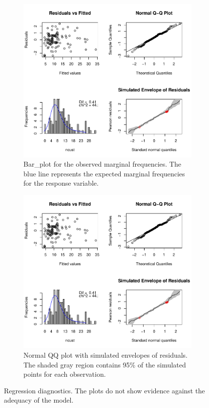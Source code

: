 \begin{figure}
	\begin{subfigure}{0.5\textwidth}
		\centering
		\includegraphics[width=\textwidth]{diagnostics_c.pdf}
		\caption{Bar\_plot for the observed marginal frequencies. The blue line represents the expected marginal frequencies for the response variable.}
		\label{fig:diagnostics:c}
	\end{subfigure}
	\hfill
	\begin{subfigure}{0.475\textwidth}
		\centering
		\includegraphics[width=\textwidth]{diagnostics_d.pdf}
		\caption{Normal QQ plot with simulated envelopes of residuals. The shaded gray region contains 95\% of the simulated points for each observation.}
		\label{fig:diagnostics:d}
	\end{subfigure}
	\caption{Regression diagnostics. The plots do not show evidence against the adequacy of the model.}
	\label{fig:diagnostics}
\end{figure}


